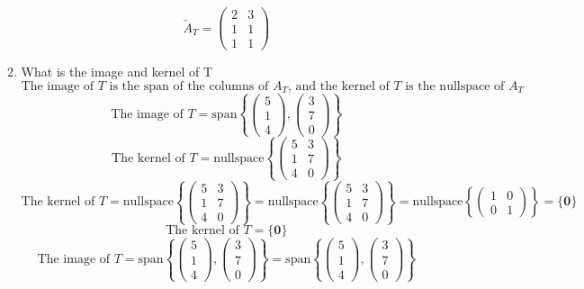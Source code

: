 \documentclass[a3paper,12pt]{extarticle} %
\begin{document}
\begin{enumerate}
\begin{enumerate}
\[        \]
        \[
            \tilde{A}_T = \begin{pmatrix} 2 & 3 \\ 1 & 1 \\ 1 & 1 \end{pmatrix}
        \]
        \item What is the image and kernel of T
        \[
            \text{The image of } T \text{ is the span of the columns of } A_T \text{, and the kernel of } T \text{ is the nullspace of } A_T
        \]
        \[
            \text{The image of } T = \text{span}\left\{ \begin{pmatrix} 5 \\ 1 \\ 4 \end{pmatrix}, \begin{pmatrix} 3 \\ 7 \\ 0 \end{pmatrix} \right\}
        \]
        \[
            \text{The kernel of } T = \text{nullspace}\left\{ \begin{pmatrix} 5 & 3 \\ 1 & 7 \\ 4 & 0 \end{pmatrix} \right\}
        \]
        \[
            \text{The kernel of } T = \text{nullspace}\left\{ \begin{pmatrix} 5 & 3 \\ 1 & 7 \\ 4 & 0 \end{pmatrix} \right\} = \text{nullspace}\left\{ \begin{pmatrix} 5 & 3 \\ 1 & 7 \\ 4 & 0 \end{pmatrix} \right\} = \text{nullspace}\left\{ \begin{pmatrix} 1 & 0 \\ 0 & 1 \end{pmatrix} \right\} = \{ \mathbf{0} \}
        \]
        \[
            \text{The kernel of } T = \{ \mathbf{0} \}
        \]
        \[
            \text{The image of } T = \text{span}\left\{ \begin{pmatrix} 5 \\ 1 \\ 4 \end{pmatrix}, \begin{pmatrix} 3 \\ 7 \\ 0 \end{pmatrix} \right\} = \text{span}\left\{ \begin{pmatrix} 5 \\ 1 \\ 4 \end{pmatrix}, \begin{pmatrix} 3 \\ 7 \\ 0 \end{pmatrix} \right\}
\]
\end{enumerate}
\end{enumerate}
\end{document}
